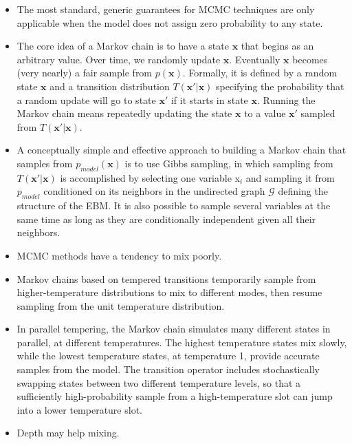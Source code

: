 \documentclass{article}
\begin{document}
\begin{itemize}
\item The most standard, generic guarantees for MCMC techniques are only applicable when the model does not assign zero probability to any state.
\item The core idea of a Markov chain is to have a state \(\boldsymbol{x}\) that begins as an arbitrary value. Over time, we randomly update \(\boldsymbol{x}\). Eventually \(\boldsymbol{x}\) becomes (very nearly) a fair sample from \(p(\boldsymbol{x})\). Formally, it is defined by a random state \(\boldsymbol{x}\) and a transition distribution \(T(\boldsymbol{x}' | \boldsymbol{x})\) specifying the probability that a random update will go to state \(\boldsymbol{x}'\) if it starts in state \(\boldsymbol{x}\). Running the Markov chain means repeatedly updating the state \(\boldsymbol{x}\) to a value \(\boldsymbol{x}'\) sampled from \(T(\boldsymbol{x}' | \boldsymbol{x})\).
\item A conceptually simple and effective approach to building a Markov chain that samples from \(p_{model}(\boldsymbol{x})\) is to use Gibbs sampling, in which sampling from \(T(\boldsymbol{x}' | \boldsymbol{x})\) is accomplished by selecting one variable x\(_i\) and sampling it from \(p_{model}\) conditioned on its neighbors in the undirected graph \(\mathcal{G}\) defining the structure of the EBM. It is also possible to sample several variables at the same time as long as they are conditionally independent given all their neighbors.
\item MCMC methods have a tendency to mix poorly.
\item Markov chains based on tempered transitions temporarily sample from higher-temperature distributions to mix to different modes, then resume sampling from the unit temperature distribution.
\item In parallel tempering, the Markov chain simulates many different states in parallel, at different temperatures. The highest temperature states mix slowly, while the lowest temperature states, at temperature 1, provide accurate samples from the model. The transition operator includes stochastically swapping states between two different temperature levels, so that a sufficiently high-probability sample from a high-temperature slot can jump into a lower temperature slot.
\item Depth may help mixing.
\end{itemize}
\end{document}
